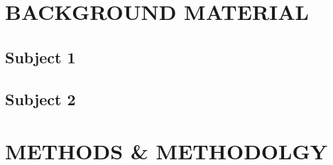 \documentclass{article}
\begin{document}
\newpage

\section{BACKGROUND MATERIAL}

\subsection{Subject 1}

\subsection{Subject 2}

\newpage
\section{METHODS \& METHODOLGY}
\end{document}
